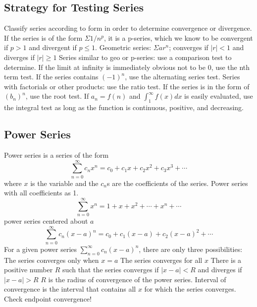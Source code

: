 \documentclass{article}
\begin{document}
    \subsection{Strategy for Testing Series}
    \begin{outline}
        \1 Classify series according to form in order to determine convergence or divergence. 
        \1 If the series is of the form \(\Sigma 1/n^p\), it is a p-series, which we know to be convergent if \(p>1\) and divergent if \(p\leq 1\).
        \1 Geometric series: \(\Sigma ar^n\); converges if \(|r|<1\) and diverges if \(|r|\geq 1\)
        \1 Series similar to geo or p-series: use a comparison test to determine. 
        \1 If the limit at infinity is immediately obvious not to be 0, use the nth term test. 
        \1 If the series contains \((-1)^n\), use the alternating series test. 
        \1 Series with factorials or other products: use the ratio test. 
        \1 If the series is in the form of \((b_n)^n\), use the root test. 
        \1 If \(a_n=f(n)\) and \(\int^\infty_1f(x)dx\) is easily evaluated, use the integral test as long as the function is continuous, positive, and decreasing. 

    \end{outline}

    \subsection{Power Series}
    \begin{outline}
        \1 Power series is a series of the form \[\sum^\infty_{n=0}c_nx^n=c_0+c_1x+c_2x^2+c_3x^3+\cdots\] where $x$ is the variable and the $c_n$s are the coefficients of the series. 
        \1 Power series with all coefficients as 1. \[\sum^\infty_{n=0}x^n=1+x+x^2+\cdots+x^n+\cdots\]
        \1 power series centered about $a$ \[\sum^\infty_{n=0}c_n(x-a)^n=c_0+c_1(x-a)+c_2(x-a)^2+\cdots\]
        \1 For a given power series \(\sum^\infty_{n=0}c_n(x-a)^n\), there are only three possibilities: 
            \2 The series converges only when \(x=a\)
            \2 The series converges for all $x$
            \2 There is a positive number $R$ such that the series converges if \(|x-a|<R\) and diverges if \(|x-a|>R\)
        \1 $R$ is the radius of convergence of the power series. Interval of convergence is the interval that contains all $x$ for which the series converges. 
        \1 Check endpoint convergence!

    \end{outline}
\end{document}
